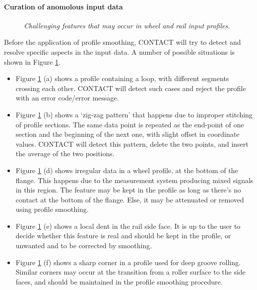 \documentclass[12pt]{report}
\begin{document}
\paragraph{Curation of anomolous input data}

\begin{figure}[bt]
\centering
{}
\caption{\em Challenging features that may occur in wheel and rail input
        profiles.}
\label{fig:profile_errors}
\end{figure}

Before the application of profile smoothing, CONTACT will try to detect and
resolve specific aspects in the input data. A number of possible situations is
shown in Figure \ref{fig:profile_errors}.
\begin{itemize}
\item Figure \ref{fig:profile_errors} (a) shows a profile containing a loop,
        with different segments crossing each other. CONTACT will detect
        such cases and reject the profile with an error code/error message.
\item Figure \ref{fig:profile_errors} (b) shows a `zig-zag pattern' that
        happens due to improper stitching of profile sections. The same
        data point is repeated as the end-point of one section and the
        beginning of the next one, with slight offset in coordinate values.
        CONTACT will detect this pattern, delete the two points, and insert
        the average of the two positions.
\item Figure \ref{fig:profile_errors} (d) shows irregular data in a wheel
        profile, at the bottom of the flange. This happens due to the
        measurement system producing mixed signals in this region.
        The feature may be kept in the profile as long as there's no
        contact at the bottom of the flange. Else, it may be attenuated or
        removed using profile smoothing.
\item Figure \ref{fig:profile_errors} (e) shows a local dent in the rail
        side face. It is up to the user to decide whether this feature
        is real and should be kept in the profile, or unwanted and to be
        corrected by smoothing.
\item Figure \ref{fig:profile_errors} (f) shows a sharp corner in a
        profile used for deep groove rolling. Similar corners may occur
        at the transition from a roller surface to the side faces, and
        should be maintained in the profile smoothing procedure.
\end{itemize}
\end{document}
